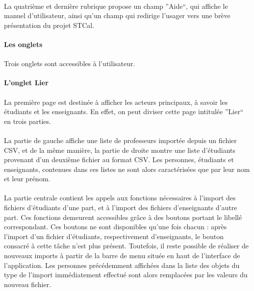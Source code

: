 \documentclass[a4paper,10pt]{report}
\begin{document}
	  \paragraph{}
	    La quatrième et dernière rubrique propose un champ ''Aide``, qui affiche le manuel d'utilisateur, ainsi qu'un champ qui redirige l'usager vers une brève présentation du projet STCal. 
      
	  \paragraph{Les onglets}
	  
	  
	    \paragraph{}
	      Trois onglets sont accessibles à l'utilisateur.
	  
	    \paragraph{L'onglet Lier}
	      \paragraph{}
		La première page est destinée à afficher les acteurs principaux, à savoir les étudiants et les enseignants. 
		En effet, on peut diviser cette page intitulée ''Lier`` en trois parties.
		
	      \paragraph{}
		La partie de gauche affiche une liste de professeurs importée depuis un fichier CSV, et de la même manière, la partie de droite montre une liste d'étudiants provenant d'un deuxième fichier au format CSV.
		Les personnes, étudiants et enseignants, contenues dans ces listes ne sont alors caractérisées que par leur nom et leur prénom.
	      
	      \paragraph{}
		La partie centrale contient les appels aux fonctions nécessaires à l'import des fichiers d'étudiants d'une part, et à l'import des fichiers d'enseignants d'autre part.
		Ces fonctions demeurent accessibles grâce à des boutons portant le libellé correspondant.
		Ces boutons ne sont disponibles qu'une fois chacun : après l'import d'un fichier d'étudiants, respectivement d'enseignants, le bouton consacré à cette tâche n'est plus présent.
		Toutefois, il reste possible de réaliser de nouveaux imports à partir de la barre de menu située en haut de l'interface de l'application.
		Les personnes précédemment affichées dans la liste des objets du type de l'import immédiatement effectué sont alors remplacées par les valeurs du nouveau fichier.  
		
\end{document}
